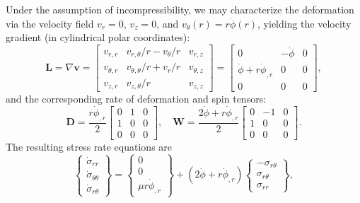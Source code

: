 Under the assumption of incompressibility, we may characterize the deformation via the velocity field $v_r = 0$, $v_z = 0$, and $v_\theta (r) = r \dot{\phi}(r)$, yielding the velocity gradient (in cylindrical polar coordinates):
\begin{equation}
  \mathbf{L} = \nabla \mathbf{v} = \left[ \begin{array}{ccc} v_{r,r} & v_{r,\theta}/r-v_\theta /r & v_{r,z} \\
      v_{\theta,r} & v_{\theta,\theta}/r + v_r /r & v_{\theta,z} \\
      v_{z,r} & v_{z,\theta} /r & v_{z,z} \end{array} \right] = 
  \left[ \begin{array}{ccc} 0 & -\dot{\phi} & 0 \\
      \dot{\phi} + r \dot{\phi}_{,r} & 0 & 0 \\
      0 & 0 & 0 \end{array} \right],
\end{equation}
and the corresponding rate of deformation and spin tensors:
\begin{equation}
  \mathbf{D} = \frac{r \dot{\phi}_{,r}}{2} \left[ \begin{array}{ccc} 0 & 1 & 0 \\
      1 & 0 & 0 \\
      0 & 0 & 0 \end{array} \right], \quad \mathbf{W} = 
  \frac{2 \dot{\phi} + r \dot{\phi}_{,r}}{2} \left[ \begin{array}{ccc} 0 & - 1 & 0 \\
      1 & 0 & 0 \\
      0 & 0 & 0 \end{array} \right].
\end{equation}
The resulting stress rate equations are
\begin{equation}
  \left\{ \begin{array}{c} \dot{\sigma}_{rr} \\ \dot{\sigma}_{\theta \theta} \\ \dot{\sigma}_{r \theta} \end{array} \right\} = \left\{ \begin{array}{c} 0 \\ 0 \\ \mu r \dot{\phi}_{,r} \end{array} \right\} + 
  (2 \dot{\phi} + r \dot{\phi}_{,r}) \left\{ \begin{array}{c} - \sigma_{r \theta} \\ \sigma_{r \theta} \\ \sigma_{rr} \end{array} \right\},
\end{equation}

